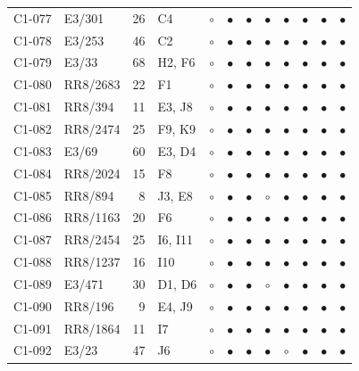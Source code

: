 {\begin{longtable}{llrp{3.9cm}cccccccc}
    C1-077 & E3/301 & 26 & C4 & $\circ$ & $\bullet$ & $\bullet$ & $\bullet$ & $\bullet$ & $\bullet$ & $\bullet$ & $\bullet$ \\
    C1-078 & E3/253 & 46 & C2 & $\circ$ & $\bullet$ & $\bullet$ & $\bullet$ & $\bullet$ & $\bullet$ & $\bullet$ & $\bullet$ \\
    C1-079 & E3/33 & 68 & H2, F6 & $\circ$ & $\bullet$ & $\bullet$ & $\bullet$ & $\bullet$ & $\bullet$ & $\bullet$ & $\bullet$ \\
    C1-080 & RR8/2683 & 22 & F1 & $\circ$ & $\bullet$ & $\bullet$ & $\bullet$ & $\bullet$ & $\bullet$ & $\bullet$ & $\bullet$ \\
    C1-081 & RR8/394 & 11 & E3, J8 & $\circ$ & $\bullet$ & $\bullet$ & $\bullet$ & $\bullet$ & $\bullet$ & $\bullet$ & $\bullet$ \\
    C1-082 & RR8/2474 & 25 & F9, K9 & $\circ$ & $\bullet$ & $\bullet$ & $\bullet$ & $\bullet$ & $\bullet$ & $\bullet$ & $\bullet$ \\
    C1-083 & E3/69 & 60 & E3, D4 & $\circ$ & $\bullet$ & $\bullet$ & $\bullet$ & $\bullet$ & $\bullet$ & $\bullet$ & $\bullet$ \\
    C1-084 & RR8/2024 & 15 & F8 & $\circ$ & $\bullet$ & $\bullet$ & $\bullet$ & $\bullet$ & $\bullet$ & $\bullet$ & $\bullet$ \\
    C1-085 & RR8/894 & 8 & J3, E8 & $\circ$ & $\bullet$ & $\bullet$ & $\circ$ & $\bullet$ & $\bullet$ & $\bullet$ & $\bullet$ \\
    C1-086 & RR8/1163 & 20 & F6 & $\circ$ & $\bullet$ & $\bullet$ & $\bullet$ & $\bullet$ & $\bullet$ & $\bullet$ & $\bullet$ \\
    C1-087 & RR8/2454 & 25 & I6, I11 & $\circ$ & $\bullet$ & $\bullet$ & $\bullet$ & $\bullet$ & $\bullet$ & $\bullet$ & $\bullet$ \\
    C1-088 & RR8/1237 & 16 & I10 & $\circ$ & $\bullet$ & $\bullet$ & $\bullet$ & $\bullet$ & $\bullet$ & $\bullet$ & $\bullet$ \\
    C1-089 & E3/471 & 30 & D1, D6 & $\circ$ & $\bullet$ & $\bullet$ & $\circ$ & $\bullet$ & $\bullet$ & $\bullet$ & $\bullet$ \\
    C1-090 & RR8/196 & 9 & E4, J9 & $\circ$ & $\bullet$ & $\bullet$ & $\bullet$ & $\bullet$ & $\bullet$ & $\bullet$ & $\bullet$ \\
    C1-091 & RR8/1864 & 11 & I7 & $\circ$ & $\bullet$ & $\bullet$ & $\bullet$ & $\bullet$ & $\bullet$ & $\bullet$ & $\bullet$ \\
    C1-092 & E3/23 & 47 & J6 & $\circ$ & $\bullet$ & $\bullet$ & $\bullet$ & $\circ$ & $\bullet$ & $\bullet$ & $\bullet$ \\

\end{longtable}}
